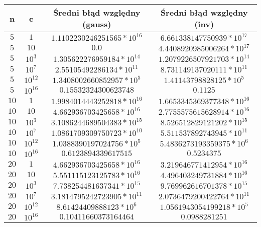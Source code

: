 \documentclass{article}
\begin{document}
\begin{center}
	\begin{tabular}{|c|c|c|c|}
		\hline
		\textbf{n} & \textbf{c} & \textbf{Średni błąd względny (gauss)} & \textbf{Średni błąd względny (inv)} \\
		\hline
		$5$        & $1$        & $1.1102230246251565*10^{16}$          & $6.661338147750939*10^{17}$         \\
		\hline
		$5$        & $10$       & $0.0$                                 & $4.4408920985006264*10^{17}$        \\
		\hline
		$5$        & $10^3$     & $1.305622276959184*10^{14}$           & $1.2079226507921703*10^{14}$        \\
		\hline
		$5$        & $10^7$     & $2.55105492286134*10^{11}$            & $8.731149137020111*10^{11}$         \\
		\hline
		$5$        & $10^{12}$  & $1.3408002660852957*10^{5}$           & $1.41143798828125*10^{5}$           \\
		\hline
		$5$        & $10^{16}$  & $0.15532324300623748$                 & $0.1125$                            \\
		\hline
		$10$       & $1$        & $1.9984014443252818*10^{16}$          & $1.6653345369377348*10^{16}$        \\
		\hline
		$10$       & $10$       & $4.662936703425658*10^{16}$           & $2.7755575615628914*10^{16}$        \\
		\hline
		$10$       & $10^3$     & $3.1086244689504383*10^{15}$          & $8.526512829121202*10^{15}$         \\
		\hline
		$10$       & $10^7$     & $1.0861709309750723*10^{10}$          & $5.511537892743945*10^{11}$         \\
		\hline
		$10$       & $10^{12}$  & $1.0388390197024756*10^{5}$           & $5.4836273193359375*10^{6}$         \\
		\hline
		$10$       & $10^{16}$  & $0.6123894339617515$                  & $0.5234375$                         \\
		\hline
		$20$       & $1$        & $4.662936703425658*10^{16}$           & $3.219646771412954*10^{16}$         \\
		\hline
		$20$       & $10$       & $5.551115123125783*10^{16} $          & $4.496403249731884*10^{16}$         \\
		\hline
		$20$       & $10^3$     & $7.738254481637341*10^{15} $          & $9.769962616701378*10^{15}$         \\
		\hline
		$20$       & $10^7$     & $3.1814795242723905*10^{11} $         & $2.0736479200422764*10^{11}$        \\
		\hline
		$20$       & $10^{12}$  & $8.61424409888123*10^{6}$             & $1.0561943054199218*10^{5}$         \\
		\hline
		$20$       & $10^{16}$  & $0.10411660373164464 $                & $0.0988281251$                      \\
		\hline
	\end{tabular}
\end{center}
\end{document}
